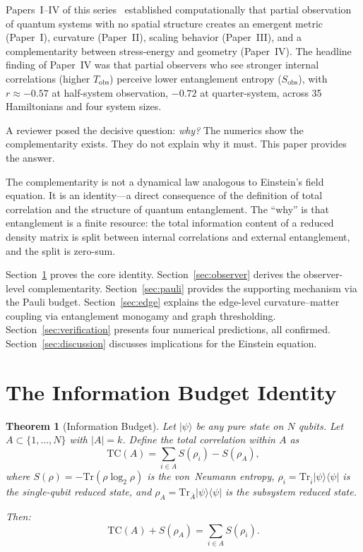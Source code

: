 \documentclass[aps,pra,twocolumn,superscriptaddress,floatfix]{revtex4-2}
\newtheorem{theorem}{Theorem}
\begin{document}
Papers~I--IV of this series~\cite{glass2026plc1,glass2026plc2,glass2026plc3,glass2026plc4}
established computationally that partial observation of quantum
systems with no spatial structure creates an emergent metric
(Paper~I), curvature (Paper~II), scaling behavior (Paper~III),
and a complementarity between stress-energy and geometry (Paper~IV).
The headline finding of Paper~IV was that partial observers
who see stronger internal correlations (higher $T_\mathrm{obs}$)
perceive lower entanglement entropy ($S_\mathrm{obs}$),
with $r \approx -0.57$ at half-system observation,
$-0.72$ at quarter-system, across 35 Hamiltonians and
four system sizes.

A reviewer posed the decisive question: \textit{why?}
The numerics show the complementarity exists.  They do not
explain why it must.  This paper provides the answer.

The complementarity is not a dynamical law analogous to
Einstein's field equation.  It is an identity---a direct
consequence of the definition of total correlation and the
structure of quantum entanglement.  The ``why'' is that
entanglement is a finite resource: the total information
content of a reduced density matrix is split between
internal correlations and external entanglement, and
the split is zero-sum.

Section~\ref{sec:identity} proves the core identity.
Section~\ref{sec:observer} derives the observer-level
complementarity.
Section~\ref{sec:pauli} provides the supporting mechanism
via the Pauli budget.
Section~\ref{sec:edge} explains the edge-level
curvature--matter coupling via entanglement monogamy
and graph thresholding.
Section~\ref{sec:verification} presents four
numerical predictions, all confirmed.
Section~\ref{sec:discussion} discusses implications
for the Einstein equation.


\section{The Information Budget Identity}
\label{sec:identity}

\begin{theorem}[Information Budget]
\label{thm:budget}
Let $|\psi\rangle$ be any pure state on $N$ qubits.
Let $A \subset \{1, \ldots, N\}$ with $|A| = k$.
Define the total correlation within $A$ as
\begin{equation}
\mathrm{TC}(A) = \sum_{i \in A} S(\rho_i) - S(\rho_A),
\label{eq:tc}
\end{equation}
where $S(\rho) = -\mathrm{Tr}(\rho \log_2 \rho)$ is the
von~Neumann entropy, $\rho_i = \mathrm{Tr}_{\bar{i}}|\psi\rangle\langle\psi|$
is the single-qubit reduced state, and $\rho_A = \mathrm{Tr}_{\bar{A}}|\psi\rangle\langle\psi|$
is the subsystem reduced state.

Then:
\begin{equation}
\mathrm{TC}(A) + S(\rho_A) = \sum_{i \in A} S(\rho_i).
\label{eq:identity}
\end{equation}
\end{theorem}
\end{document}
